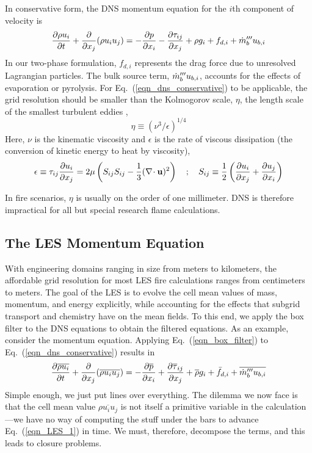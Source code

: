 In conservative form, the DNS momentum equation for the $i$th component of velocity is
\begin{equation}
\label{eqn_dns_conservative}
\frac{\partial \rho u_i}{\partial t} + \frac{\partial}{\partial x_j} (\rho u_i u_j) = -\frac{\partial p}{\partial x_i} - \frac{\partial \tau_{ij}}{\partial x_j} + \rho g_i + f_{d,i} + \dot{m}_b^{\prime\prime\prime} u_{b,i}
\end{equation}
In our two-phase formulation, $f_{d,i}$ represents the drag force due to unresolved Lagrangian particles.  The bulk source term, $\dot{m}_b^{\prime\prime\prime} u_{b,i}$, accounts for the effects of evaporation or pyrolysis. For Eq.~(\ref{eqn_dns_conservative}) to be applicable, the grid resolution should be smaller than the Kolmogorov scale, $\eta$, the length scale of the smallest turbulent eddies \cite{Pope:2000},
\begin{equation}
\label{eqn_kolmogorov_scale}
\eta \equiv (\nu^3/\epsilon)^{1/4}
\end{equation}
Here, $\nu$ is the kinematic viscosity and $\epsilon$ is the rate of viscous dissipation (the conversion of kinetic energy to heat by viscosity),
\begin{equation}
\epsilon \equiv \tau_{ij} \frac{\partial u_i}{\partial x_j} = 2 \mu \left( S_{ij} S_{ij} - \frac{1}{3} (\nabla\!\cdot {\bf u})^2 \right) \quad ; \quad S_{ij} \equiv \frac{1}{2}\left(\frac{\partial u_i}{\partial x_j} + \frac{\partial u_j}{\partial x_i}\right)
\end{equation}

In fire scenarios, $\eta$ is usually on the order of one millimeter.  DNS is therefore impractical for all but special research flame calculations.

\subsection{The LES Momentum Equation}

With engineering domains ranging in size from meters to kilometers, the affordable grid resolution for most LES fire calculations ranges from centimeters to meters.  The goal of the LES is to evolve the cell mean values of mass, momentum, and energy explicitly, while accounting for the effects that subgrid transport and chemistry have on the mean fields.  To this end, we apply the box filter to the DNS equations to obtain the filtered equations.  As an example, consider the momentum equation.  Applying Eq.~(\ref{eqn_box_filter}) to Eq.~(\ref{eqn_dns_conservative}) results in
\begin{equation}
\label{eqn_LES_1}
\frac{\partial \overline{\rho u_i}}{\partial t} + \frac{\partial}{\partial x_j} (\overline{\rho u_i u_j}) = -\frac{\partial \overline{p}}{\partial x_i} + \frac{\partial \overline{\tau}_{ij}}{\partial x_j} + \overline{\rho} g_i + \bar{f}_{d,i} + \overline{\dot{m}_b^{\prime\prime\prime} u_{b,i}}
\end{equation}
Simple enough, we just put lines over everything.  The dilemma we now face is that the cell mean value $\overline{\rho u_i u_j}$ is not itself a primitive variable in the calculation---we have no way of computing the stuff under the bars to advance Eq.~(\ref{eqn_LES_1}) in time.  We must, therefore, decompose the terms, and this leads to closure problems.

